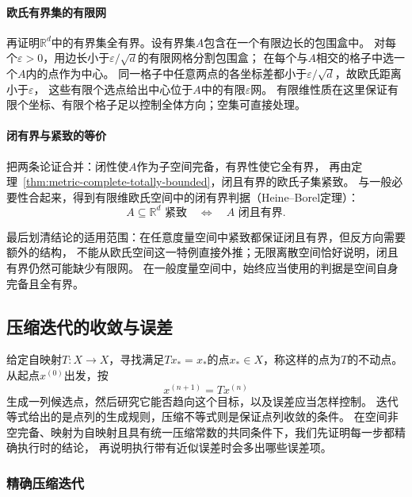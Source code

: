 \paragraph{欧氏有界集的有限网}

再证明$\mathbb R^d$中的有界集全有界。设有界集$A$包含在一个有限边长的包围盒中。
对每个$\varepsilon>0$，用边长小于$\varepsilon/\sqrt d$的有限网格分割包围盒；
在每个与$A$相交的格子中选一个$A$内的点作为中心。
同一格子中任意两点的各坐标差都小于$\varepsilon/\sqrt d$，故欧氏距离小于$\varepsilon$，
这些有限个选点给出中心位于$A$中的有限$\varepsilon$网。
有限维性质在这里保证有限个坐标、有限个格子足以控制全体方向；空集可直接处理。

\paragraph{闭有界与紧致的等价}

把两条论证合并：闭性使$A$作为子空间完备，有界性使它全有界，
再由定理~\ref{thm:metric-complete-totally-bounded}，闭且有界的欧氏子集紧致。
与一般必要性合起来，得到有限维欧氏空间中的闭有界判据（Heine--Borel定理）：
\begin{equation}
\label{eq:metric-heine-borel}
  A\subseteq\mathbb R^d\text{ 紧致}\quad\Longleftrightarrow\quad A\text{ 闭且有界}.
\end{equation}

最后划清结论的适用范围：在任意度量空间中紧致都保证闭且有界，但反方向需要额外的结构，
不能从欧氏空间这一特例直接外推；无限离散空间恰好说明，闭且有界仍然可能缺少有限网。
在一般度量空间中，始终应当使用的判据是空间自身完备且全有界。

\subsection{压缩迭代的收敛与误差}
\label{sec:metric-contractive-solvers}

给定自映射$T:X\to X$，寻找满足$Tx_*=x_*$的点$x_*\in X$，称这样的点为$T$的不动点。
从起点$x^{(0)}$出发，按
\[
  x^{(n+1)}=Tx^{(n)}
\]
生成一列候选点，然后研究它能否趋向这个目标，以及误差应当怎样控制。
迭代等式给出的是点列的生成规则，压缩不等式则是保证点列收敛的条件。
在空间非空完备、映射为自映射且具有统一压缩常数的共同条件下，我们先证明每一步都精确执行时的结论，
再说明执行带有近似误差时会多出哪些误差项。

\subsubsection{精确压缩迭代}
\label{sec:metric-exact-contraction}

